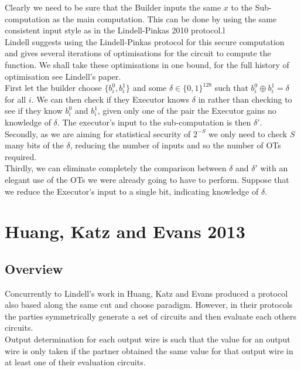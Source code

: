 \documentclass[ %
                    author={Nicholas Tutte},
                supervisor={Prof. Nigel Smart},
                    degree={MEng},
                     title={Secure Two Party Computation},
                  subtitle={A practical comparison of recent protocols},
                      type={Research - GG1K},
                      year={2015} ]{dissertation}
\begin{document}
					Clearly we need to be sure that the Builder inputs the same $x$ to the Sub-computation as the main computation. This can be done by using the same consistent input style as in the Lindell-Pinkas 2010 protocol.l\\

					Lindell suggests using the Lindell-Pinkas protocol for this secure computation and gives several iterations of optimisations for the circuit to compute the function. We shall take these optimisations in one bound, for the full history of optimisation see Lindell's paper.\\

					First let the builder choose $\{b_i^0, b_i^1\}$ and some $\delta \in \{0, 1\}^{128}$ such that $b_i^0 \oplus b_i^1 = \delta$ for all $i$. We can then check if they Executor knows $\delta$ in rather than checking to see if they know $b_i^0$ and $b_i^1$, given only one of the pair the Executor gains no knowledge of $\delta$. The executor's input to the sub-computation is then $\delta'$.\\

					Secondly, as we are aiming for statistical security of $2^{-S}$ we only need to check $S$ many bits of the $\delta$, reducing the number of inputs and so the number of OTs required.\\

					Thirdly, we can eliminate completely the comparison between $\delta$ and $\delta'$ with an elegant use of the OTs we were already going to have to perform. Suppose that we reduce the Executor's input to a single bit, indicating knowledge of $\delta$.\\

		\section{Huang, Katz and Evans 2013}
			\subsection*{Overview}

				Concurrently to Lindell's work in \cite{Lindell_CnC_2013} Huang, Katz and Evans produced a protocol also based along the same cut and choose paradigm. However, in their protocols the parties symmetrically generate a set of circuits and then evaluate each others circuits.\\

				Output determination for each output wire is such that the value for an output wire is only taken if the partner obtained the same value for that output wire in at least one of their evaluation circuits.\\
\end{document}
